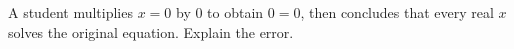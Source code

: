 A student multiplies $x=0$ by $0$ to obtain $0=0$, then concludes that every real $x$ solves the original equation. Explain the error.
